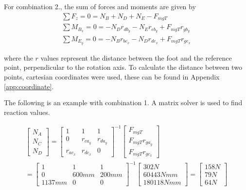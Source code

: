 For combination 2., the sum of forces and moments are given by
\begin{gather}
    \sum F_z = 0 = N_B + N_D + N_E - F_{mgT}
    \\
    \sum M_{B_x} = 0 = -N_D r_{db_y} - N_E r_{eb_y} + F_{mgT} r_{gb_y}
    \\
    \sum M_{E_y} = 0 = -N_B r_{be_x} -N_D r_{de_x} + F_{mgT} r_{ge_x}
\end{gather}

where the $r$ values represent the distance between the foot and the reference point, perpendicular to the rotation axis. To calculate the distance between two points, cartesian coordinates were used, these can be found in Appendix \ref{app:coordinate}.

The following is an example with combination 1. A matrix solver is used to find reaction values.

\begin{equation}
\begin{split}
    \left[ \begin{array}{ccc} 
    N_A 
    \\ 
   N_C
    \\ 
    N_D
    \end{array} \right]= \left[ \begin{array}{ccc} 
    1 & 1 & 1 
    \\ 
    0 & r_{ca_y} & r_{da_y} 
    \\ 
    r_{ac_x} & r_{dc_x} & 0
    \end{array} \right]^{-1}
    \left[ \begin{array}{ccc} 
    F_{mgT}
    \\ 
    F_{mgT} r_{ga_y} 
    \\ 
    F_{mgT} r_{gc_x}
    \end{array} \right] 
    \\ 
   = \left[ \begin{array}{ccc} 
    1 & 1 & 1 
    \\ 
    0 & 600 mm & 200mm 
    \\ 
    1137mm & 0 & 0
    \end{array} \right]^{-1}
    \left[ \begin{array}{ccc} 
    302N
    \\ 
    60443Nmm
    \\ 
    180118Nmm
    \end{array} \right] 
    = 
    \left[ \begin{array}{ccc} 
    158N
    \\ 
    79N
    \\ 
    64N
    \end{array} \right] 
\end{split}
\end{equation}

